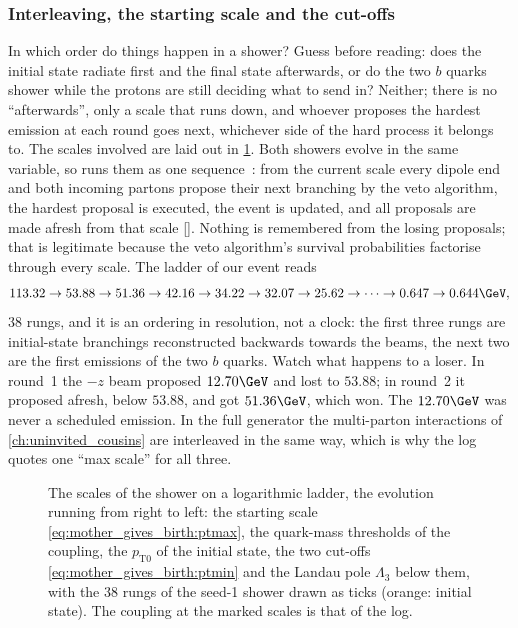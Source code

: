 \subsubsection{Interleaving, the starting scale and the cut-offs}
\label{sec:mother_gives_birth:scales}

In which order do things happen in a shower? Guess before reading: does the
initial state radiate first and the final state afterwards, or do the two
$b$ quarks shower while the protons are still deciding what to send in?
Neither; there is no ``afterwards'', only a scale that runs down, and
whoever proposes the hardest emission at each round goes next, whichever
side of the hard process it belongs to. The scales involved are laid out in
\cref{fig:mother_gives_birth:scale_ladder}.
Both showers evolve in the same variable, so \PYTHIA runs them as one
sequence~\cite{Sjostrand:2004ef}: from the current scale every dipole end
and both incoming partons propose their next branching by the veto
algorithm, the hardest proposal is executed, the event is updated, and all
proposals are made afresh from that scale []. Nothing is
remembered from the losing proposals; that is legitimate because the veto
algorithm's survival probabilities factorise through every scale. The
ladder of our event reads
\begin{equation*}
  113.32\to53.88\to51.36\to42.16\to34.22\to32.07\to25.62\to\cdots
  \to0.647\to0.644\GeV ,
\end{equation*}
38 rungs, and it is an ordering in resolution, not a clock: the first
three rungs are initial-state branchings reconstructed backwards towards
the beams, the next two are the first emissions of the two $b$ quarks.
Watch what happens to a loser. In round~1 the $-z$ beam proposed
$12.70\GeV$ and lost to $53.88$; in round~2 it proposed afresh, below
$53.88$, and got $51.36\GeV$, which won. The $12.70\GeV$ was never a
scheduled emission. In the
full generator the multi-parton interactions of \cref{ch:uninvited_cousins}
are interleaved in the same way, which is why the \CMSSW log quotes one
``max \pt scale'' for all three.

\begin{figure}[htbp]\centering
\resizebox{\textwidth}{!}{}
\caption[The scales of the shower on a logarithmic ladder with the 38 rungs of our event]{The scales of the shower on a logarithmic ladder, the evolution running from right to left: the starting scale \cref{eq:mother_gives_birth:ptmax}, the quark-mass thresholds of the coupling, the $p_{\mathrm{T}0}$ of the initial state, the two cut-offs \cref{eq:mother_gives_birth:ptmin} and the Landau pole $\Lambda_3$ below them, with the $38$ rungs of the seed-1 shower drawn as ticks (orange: initial state). The coupling at the marked scales is that of the  log.}
\label{fig:mother_gives_birth:scale_ladder}
\end{figure}


